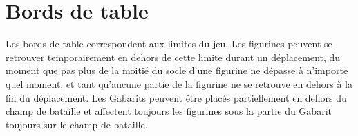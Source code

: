 \section{Bords de table}

Les bords de table correspondent aux limites du jeu. Les figurines peuvent se retrouver temporairement en dehors de cette limite durant un déplacement, du moment que pas plus de la moitié du socle d'une figurine ne dépasse à n'importe quel moment, et tant qu'aucune partie de la figurine ne se retrouve en dehors à la fin du déplacement. Les Gabarits peuvent être placés partiellement en dehors du champ de bataille et affectent toujours les figurines sous la partie du Gabarit toujours sur le champ de bataille.

